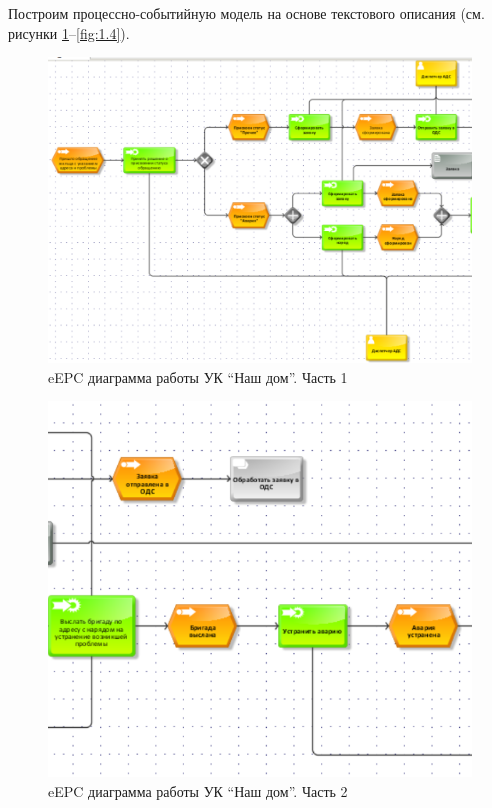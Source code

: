 \documentclass[a4paper,14pt]{extarticle}
\begin{document}
\begin{problem*}
Построим процессно-событийную модель на основе текстового описания (см. рисунки \ref{fig:1.1}--\ref{fig:1.4}).

	\begin{figure}[h!]
	\centering
	\includegraphics[width=0.7\linewidth]{images/pr-20/1.1}
	\caption{eEPC диаграмма работы УК “Наш дом”. Часть 1}
	\label{fig:1.1}
	\end{figure}
	
	\begin{figure}[h!]
	\centering
	\includegraphics[width=0.7\linewidth]{images/pr-20/1.2}
	\caption{eEPC диаграмма работы УК “Наш дом”. Часть 2}
	\label{fig:1.2}
	\end{figure}
	

\end{problem*}
\end{document}
